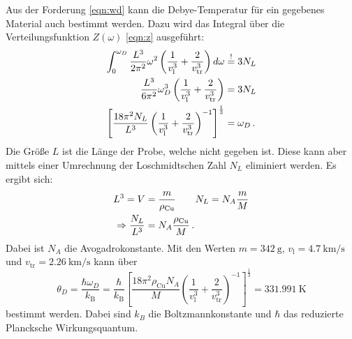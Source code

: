 Aus der Forderung \eqref{eqn:wd} kann die Debye-Temperatur für ein gegebenes Material auch bestimmt werden. Dazu wird das Integral über die Verteilungsfunktion $Z(\omega)$ \eqref{eqn:z} ausgeführt:
\begin{align*}
	\int_0^{\omega_D} \frac{L^3}{2\pi^2}\omega^2\left(\frac{1}{v_\text{l}^3}+\frac{2}{v_\text{tr}^3}\right) d\omega &\overset{!}{=} 3 N_L\\
	\frac{L^3}{6\pi^2}\omega_D^3\left(\frac{1}{v_\text{l}^3}+\frac{2}{v_\text{tr}^3}\right)  &= 3N_L\\
	\left[\frac{18\pi^2N_L}{L^3}\left(\frac{1}{v_\text{l}^3}+\frac{2}{v_\text{tr}^3}\right)^{-1} \right]^{\frac{1}{3}} &= \omega_D \,\text.
\end{align*}
Die Größe $L$ ist die Länge der Probe, welche nicht gegeben ist. Diese kann aber mittels einer Umrechnung der Loschmidtschen Zahl $N_L$ eliminiert werden. Es ergibt sich:
\begin{align*}
	L^3 = V &= \frac{m}{\rho_\text{Cu}}\qquad N_L = N_A\frac{m}{M}\\
	\Rightarrow \frac{N_L}{L^3} &= N_A\frac{\rho_\text{Cu}}{M}\,\text.
\end{align*}
Dabei ist $N_A$ die Avogadrokonstante.
Mit den Werten $m = \SI{342}{\gram}$, $v_\text{l} = \SI{4.7}{\kilo\metre\per\second}$ und $v_\text{tr} = \SI{2.26}{\kilo\meter\per\second}$ kann über
\begin{equation*}
	\theta_D = \frac{\hbar\omega_D}{k_\text{B}}= \frac{\hbar}{k_\text{B}}\left[\frac{18\pi^2\rho_\text{Cu} N_A}{M}\left(\frac{1}{v_\text{l}^3}+\frac{2}{v_\text{tr}^3}\right)^{-1} \right]^{\frac{1}{3}} = \SI{331.991}{\kelvin}
\end{equation*} bestimmt werden. Dabei sind $k_B$ die Boltzmannkonstante und $\hbar$ das reduzierte Plancksche Wirkungsquantum.
